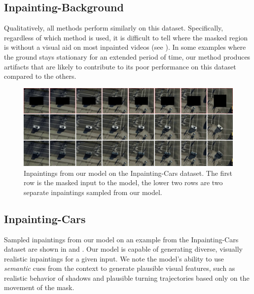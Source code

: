 \subsection{Inpainting-Background}
Qualitatively, all methods perform similarly on this dataset. Specifically, regardless of which method is used, it is difficult to tell where the masked region is without a visual aid on most inpainted videos (see ). In some examples where the ground stays stationary for an extended period of time, our method produces artifacts that are likely to contribute to its poor performance on this dataset
compared to the others. 
\begin{figure}[t]
\begin{center}
    \centering
    \captionsetup{type=figure}
    \includegraphics[width=\linewidth]{figures/updated-cars.pdf}
    \caption[Inpaintings from our model on the Inpainting-Cars dataset.]{Inpaintings from our model on the Inpainting-Cars dataset. The first row is the masked input to the model, the lower two rows are two separate inpaintings sampled from our model.}
    \label{fig:cars}
\end{center}%
\end{figure}
\subsection{Inpainting-Cars}
Sampled inpaintings from our model on an example from the Inpainting-Cars dataset are shown in  and . Our model is capable of generating diverse, visually realistic inpaintings for a given input. We note the model's ability to use \emph{semantic} cues from the context to generate plausible visual features, such as realistic behavior of shadows and plausible turning trajectories based only on the movement of the mask.

